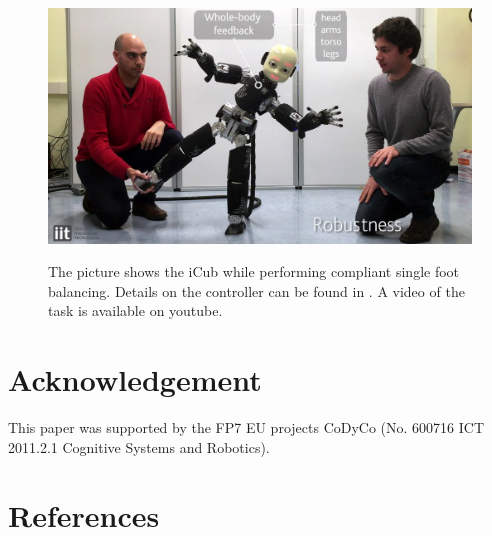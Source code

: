 \documentclass[final,5p,twocolumn]{elsarticle}
\begin{document}
\begin{figure}[h!]
\centering
{\includegraphics[width=\linewidth]{images/single_foot_balancing.jpg}}
\caption{The picture shows the iCub while performing compliant single foot balancing. Details on the controller can be found in \cite{Nori2015a}. A video of the task is available on youtube\protect\footnotemark.}
\label{fig:footBalancing}
\end{figure}


\section{Acknowledgement}
This paper was supported by the FP7 EU projects CoDyCo (No. 600716 ICT 2011.2.1 Cognitive Systems and Robotics).

\section{References}


\end{document}
